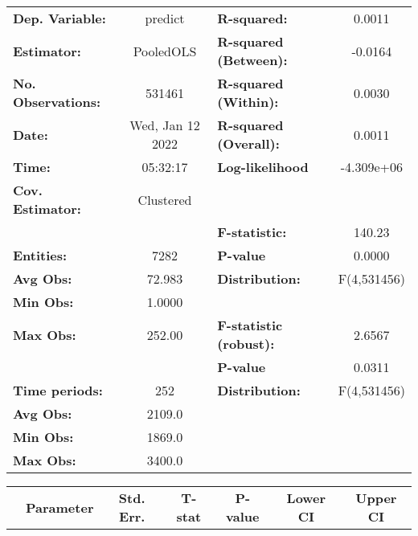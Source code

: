 \begin{center}
\begin{tabular}{lclc}
\toprule
\textbf{Dep. Variable:}    &      predict       & \textbf{  R-squared:         }   &      0.0011      \\
\textbf{Estimator:}        &     PooledOLS      & \textbf{  R-squared (Between):}  &     -0.0164      \\
\textbf{No. Observations:} &       531461       & \textbf{  R-squared (Within):}   &      0.0030      \\
\textbf{Date:}             &  Wed, Jan 12 2022  & \textbf{  R-squared (Overall):}  &      0.0011      \\
\textbf{Time:}             &      05:32:17      & \textbf{  Log-likelihood     }   &    -4.309e+06    \\
\textbf{Cov. Estimator:}   &     Clustered      & \textbf{                     }   &                  \\
\textbf{}                  &                    & \textbf{  F-statistic:       }   &      140.23      \\
\textbf{Entities:}         &        7282        & \textbf{  P-value            }   &      0.0000      \\
\textbf{Avg Obs:}          &       72.983       & \textbf{  Distribution:      }   &   F(4,531456)    \\
\textbf{Min Obs:}          &       1.0000       & \textbf{                     }   &                  \\
\textbf{Max Obs:}          &       252.00       & \textbf{  F-statistic (robust):} &      2.6567      \\
\textbf{}                  &                    & \textbf{  P-value            }   &      0.0311      \\
\textbf{Time periods:}     &        252         & \textbf{  Distribution:      }   &   F(4,531456)    \\
\textbf{Avg Obs:}          &       2109.0       & \textbf{                     }   &                  \\
\textbf{Min Obs:}          &       1869.0       & \textbf{                     }   &                  \\
\textbf{Max Obs:}          &       3400.0       & \textbf{                     }   &                  \\
\bottomrule
\end{tabular}
\begin{tabular}{lcccccc}
                & \textbf{Parameter} & \textbf{Std. Err.} & \textbf{T-stat} & \textbf{P-value} & \textbf{Lower CI} & \textbf{Upper CI}  \\

\end{tabular}
\end{center}

